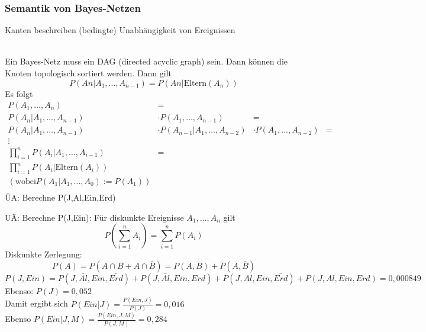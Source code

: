 \documentclass[a4paper]{scrartcl}
\begin{document}
\subsubsection{Semantik von Bayes-Netzen}
Kanten beschreiben (bedingte) Unabhängigkeit von Ereignissen\\
\\
Ein Bayes-Netz muss ein DAG (directed acyclic graph) sein. Dann können die Knoten topologisch sortiert werden. Dann gilt
\[ P(An| A_1, \dots , A_{n-1}) = P(An | \text{Eltern} (A_n)) \]
Es folgt
\begin{align*} P(A_1,\dots,A_n) &= \\
P(A_n|A_1,\dots,A_{n-1}) &\cdot P(A_1,\dots,A_{n-1}) &=\\
P(A_n |A_1,\dots,A_{n-1}) &\cdot P(A_{n-1} | A_1,\dots,A_{n-2}) &\cdot P(A_1,\dots,A_{n-2}) &= \\
\vdots \\
\prod\limits_{i=1}^{n} P(A_i | A_1, \dots, A_{i-1}) &= \\
\prod\limits_{i=1}^n P(A_i |\text{Eltern} (A_i))\\
(\text{wobei} P(A_1 | A_1,\dots,A_0) := P(A_1))\\
\end{align*}
ÜA: Berechne P(J,Al,Ein,Erd)

UÄ: Berechne P(J,Ein): Für diskunkte Ereignisse $A_1,\dots,A_n$ gilt
\[ P(\sum\limits_{i=1}^n A_i) = \sum\limits_{i=1}^n P(A_i) \]
Diskunkte Zerlegung:
\[ P(A) = P(A\cap B + A\cap \bar{B} ) = P(A,B) + P(A,\bar{B}) \]
\[ P(J,Ein) = P(J,\bar{Al},Ein,\bar{Erd}) + P(J,\bar{Al},Ein,Erd) + P(J,Al,Ein,\bar{Erd}) + P(J,Al,Ein,Erd) = 0,000849 \]
Ebenso: $P(J) = 0,052$\\
Damit ergibt sich $P(Ein|J)= \frac{P(Ein,J)}{P(J)} = 0,016 $\\
Ebenso $P(Ein | J,M) = \frac{P(Ein,J,M)}{P(J,M)} = 0,284$
\end{document}
